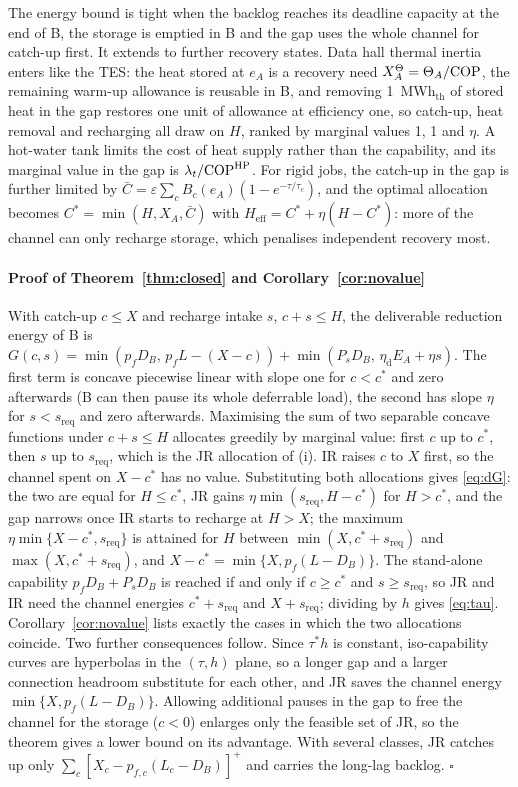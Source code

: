 The energy bound is tight when the backlog reaches its deadline capacity at the end of B, the storage is emptied in B
and the gap uses the whole channel for catch-up first. It extends to further recovery states. Data hall thermal
inertia enters like the TES: the heat stored at $e_A$ is a recovery need $X^\Theta_A=\Theta_A/\mathrm{COP}$, the remaining
warm-up allowance is reusable in B, and removing 1~MWh$_{\mathrm{th}}$ of stored heat in the gap restores one unit of
allowance at efficiency one, so catch-up, heat removal and recharging all draw on $H$, ranked by marginal values 1, 1 and
$\eta$. A hot-water tank limits the cost of heat supply rather than the capability, and its marginal value in the gap is
$\lambda_t/\mathrm{COP}^{\mathrm{HP}}$. For rigid jobs, the catch-up in the gap is further limited by
$\bar C=\varepsilon\sum_cB_c(e_A)(1-e^{-\tau/\tau_c})$, and the optimal allocation becomes $C^*=\min(H,X_A,\bar C)$ with
$H_{\mathrm{eff}}=C^*+\eta(H-C^*)$: more of the channel can only recharge storage, which penalises independent recovery
most.

\paragraph{Proof of Theorem~\ref{thm:closed} and Corollary~\ref{cor:novalue}} With catch-up $c\le X$ and recharge intake
$s$, $c+s\le H$, the deliverable reduction energy of B is $G(c,s)=\min(p_fD_B,\,p_fL-(X-c))+\min(P_sD_B,\,\eta_{\mathrm d}E_A+\eta s)$.
The first term is concave piecewise linear with slope one for $c<c^*$ and zero afterwards (B can then pause its whole
deferrable load), the second has slope $\eta$ for $s<s_{\mathrm{req}}$ and zero afterwards. Maximising the sum of two
separable concave functions under $c+s\le H$ allocates greedily by marginal value: first $c$ up to $c^*$, then $s$ up to
$s_{\mathrm{req}}$, which is the JR allocation of (i). IR raises $c$ to $X$ first, so the channel spent on $X-c^*$ has no
value. Substituting both allocations gives \eqref{eq:dG}: the two are equal for $H\le c^*$, JR gains
$\eta\min(s_{\mathrm{req}},H-c^*)$ for $H>c^*$, and the gap narrows once IR starts to recharge at $H>X$; the maximum
$\eta\min\{X-c^*,s_{\mathrm{req}}\}$ is attained for $H$ between $\min(X,c^*+s_{\mathrm{req}})$ and $\max(X,c^*+s_{\mathrm{req}})$,
and $X-c^*=\min\{X,p_f(L-D_B)\}$. The stand-alone capability $p_fD_B+P_sD_B$ is reached if and only if $c\ge c^*$ and
$s\ge s_{\mathrm{req}}$, so JR and IR need the channel energies $c^*+s_{\mathrm{req}}$ and $X+s_{\mathrm{req}}$; dividing
by $h$ gives \eqref{eq:tau}. Corollary~\ref{cor:novalue} lists exactly the cases in which the two allocations coincide.
Two further consequences follow. Since $\tau^*h$ is constant, iso-capability curves are hyperbolas in the $(\tau,h)$
plane, so a longer gap and a larger connection headroom substitute for each other, and JR saves the channel energy
$\min\{X,p_f(L-D_B)\}$. Allowing additional pauses in the gap to free the channel for the storage ($c<0$) enlarges only
the feasible set of JR, so the theorem gives a lower bound on its advantage. With several classes, JR catches up only
$\sum_c[X_c-p_{f,c}(L_c-D_B)]^+$ and carries the long-lag backlog. $\square$


